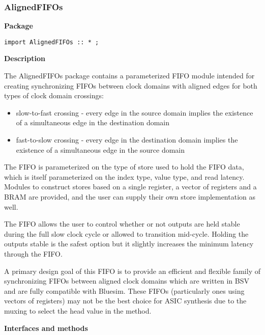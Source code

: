 \subsubsection{AlignedFIFOs}
 

\label{sec-AlignedFIFOs}

{\bf Package}

\begin{verbatim}
import AlignedFIFOs :: * ;
\end{verbatim}





{\bf Description}

The AlignedFIFOs package contains a parameterized FIFO module
intended for creating synchronizing FIFOs between clock domains
with aligned edges for both types of clock domain crossings:
\begin{itemize}
\item slow-to-fast crossing - every edge in the source domain implies
the existence of a simultaneous edge in the destination domain 
\item fast-to-slow crossing - every edge in the destination domain
implies the existence of a simultaneous edge in the source domain
\end{itemize}

The FIFO is parameterized on the type of store used to hold the
FIFO data, which is itself parameterized on the index type, value
type, and read latency.  Modules to construct stores based on a
single register, a vector of registers and a BRAM are provided, and
the user can supply their own store implementation as well.

The FIFO allows the user to control whether or not outputs are held
stable during the full slow clock cycle or allowed to transition
mid-cycle.  Holding the outputs stable is the safest option but it
 slightly increases the minimum latency through the FIFO.

A primary design goal of this FIFO is to provide an efficient
and flexible family of synchronizing FIFOs between aligned clock
 domains which are written in BSV and are fully compatible with
 Bluesim.  These FIFOs (particularly ones using vectors of registers)
 may not be the best choice for ASIC synthesis due to the muxing
 to select the head value in the  method.



{\bf Interfaces and methods} 



